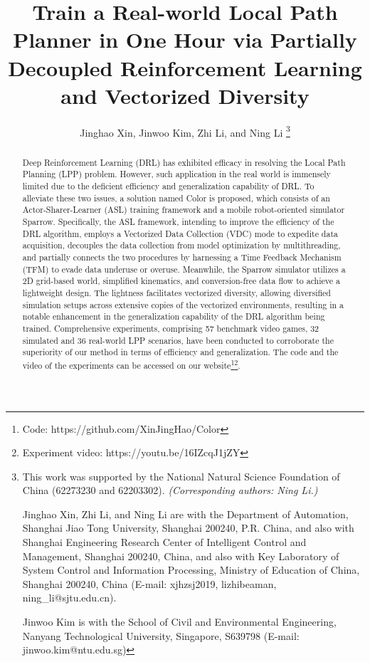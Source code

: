 \documentclass[journal]{IEEEtran}
\begin{document}
\title{Train a Real-world Local Path Planner in One Hour via Partially Decoupled Reinforcement Learning and Vectorized Diversity}

\author{Jinghao Xin, Jinwoo Kim, Zhi Li, and Ning Li
\thanks{This work was supported by the National Natural Science Foundation of China (62273230 and 62203302). \textit{(Corresponding authors: Ning Li.)} \par Jinghao Xin, Zhi Li, and Ning Li are with the Department of Automation, Shanghai Jiao Tong University, Shanghai 200240, P.R. China, and also with Shanghai Engineering Research Center of Intelligent Control and Management, Shanghai 200240, China, and also with Key Laboratory of System Control and Information Processing, Ministry of Education of China, Shanghai 200240, China (E-mail: xjhzsj2019, lizhibeaman, ning\_li@sjtu.edu.cn). \par Jinwoo Kim is with the School of Civil and Environmental Engineering, Nanyang Technological University, Singapore, S639798 (E-mail: jinwoo.kim@ntu.edu.sg)}}





\maketitle

\begin{abstract}
Deep Reinforcement Learning (DRL) has exhibited efficacy in resolving the Local Path Planning (LPP) problem. However, such application in the real world is immensely limited due to the deficient efficiency and generalization capability of DRL. To alleviate these two issues, a solution named Color is proposed, which consists of an Actor-Sharer-Learner (ASL) training framework and a mobile robot-oriented simulator Sparrow. Specifically, the ASL framework, intending to improve the efficiency of the DRL algorithm, employs a Vectorized Data Collection (VDC) mode to expedite data acquisition, decouples the data collection from model optimization by multithreading, and partially connects the two procedures by harnessing a Time Feedback Mechanism (TFM) to evade data underuse or overuse. Meanwhile, the Sparrow simulator utilizes a 2D grid-based world, simplified kinematics, and conversion-free data flow to achieve a lightweight design. The lightness facilitates vectorized diversity, allowing diversified simulation setups across extensive copies of the vectorized environments, resulting in a notable enhancement in the generalization capability of the DRL algorithm being trained. Comprehensive experiments, comprising 57 benchmark video games, 32 simulated and 36 real-world LPP scenarios, have been conducted to corroborate the superiority of our method in terms of efficiency and generalization. The code and the video of the experiments can be accessed on our website\footnote{Code: https://github.com/XinJingHao/Color}\footnote{Experiment video: https://youtu.be/16IZcqJ1jZY}.
\end{abstract}
\end{document}
